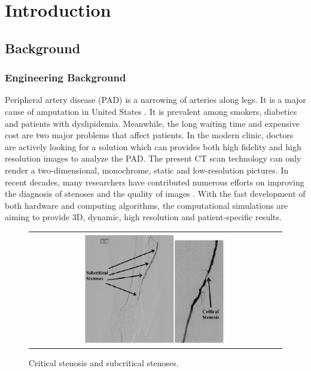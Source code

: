 \chapter{Introduction}
\label{ch:chap1}


\section{Background}

\subsection{Engineering Background}

Peripheral artery disease (PAD) is a narrowing of arteries along legs. It is a major cause of amputation in United States \cite{conte2016critical}. It is prevalent among smokers, diabetics and patients with dyslipidemia. Meanwhile, the long waiting time and expensive cost are two major problems that affect patients. In the modern clinic, doctors are actively looking for a solution which can provides both high fidelity and high resolution images to analyze the PAD. The  present CT scan technology can only render a two-dimensional,  monochrome, static and low-resolution pictures. In recent decades, many researchers have contributed numerous efforts on improving the diagnosis of stenoses and the quality of images \cite{clark1976fluid, nesbitt2009shear, wardlaw2006non, stergiopulos1992computer, long2001numerical}. With the fast development of both hardware and computing algorithms, the computational simulations are aiming to provide 3D, dynamic, high resolution and patient-specific results.

\begin{figure}[H]
	\centering
	\begin{tabular}{c}
		\includegraphics[width=0.6\textwidth]{./pics/photo.png}
	\end{tabular}
	\caption{\footnotesize Critical stenosis and subcritical stenoses.} \label{fig: photo}
\end{figure}

